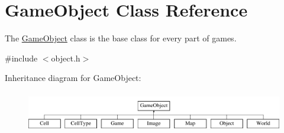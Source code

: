 \hypertarget{class_game_object}{}\section{Game\+Object Class Reference}
\label{class_game_object}


The \hyperlink{class_game_object}{Game\+Object} class is the base class for every part of games.  




{\ttfamily \#include $<$object.\+h$>$}

Inheritance diagram for Game\+Object\+:\begin{figure}[H]
\begin{center}
\leavevmode
\includegraphics[height=1.797753cm]{class_game_object}
\end{center}
\end{figure}
